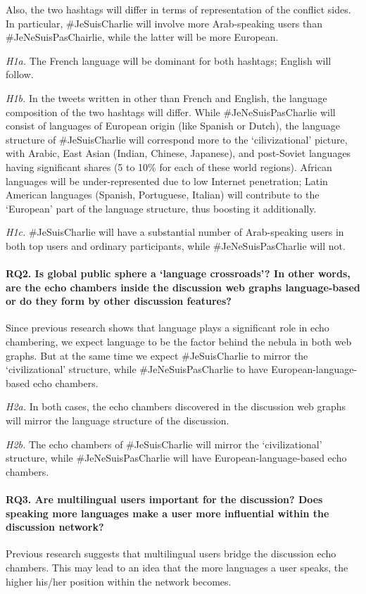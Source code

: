 Also, the two hashtags will differ in terms of representation of the conflict sides. In particular, \#JeSuisCharlie will involve more Arab-speaking users than \#JeNeSuisPasChairlie, while the latter will be more European.

\textit{H1a.} The French language will be dominant for both hashtags; English will follow.

\textit{H1b.} In the tweets written in other than French and English, the language composition of the two hashtags will differ. While \#JeNeSuisPasCharlie will consist of languages of European origin (like Spanish or Dutch), the language structure of \#JeSuisCharlie will correspond more to the ‘cilivizational’ picture, with Arabic, East Asian (Indian, Chinese, Japanese), and post-Soviet languages having significant shares (5 to 10\% for each of these world regions). African languages will be under-represented due to low Internet penetration; Latin American languages (Spanish, Portuguese, Italian) will contribute to the ‘European’ part of the language structure, thus boosting it additionally.

\textit{H1c.} \#JeSuisCharlie will have a substantial number of Arab-speaking users in both top users and ordinary participants, while \#JeNeSuisPasCharlie will not.

\paragraph{RQ2. Is global public sphere a ‘language crossroads’? In other words, are the echo chambers inside the discussion web graphs language-based or do they form by other discussion features?}
Since previous research shows that language plays a significant role in echo chambering, we expect language to be the factor behind the nebula in both web graphs. But at the same time we expect \#JeSuisCharlie to mirror the ‘civilizational’ structure, while \#JeNeSuisPasCharlie to have European-language-based echo chambers.

\textit{H2a.} In both cases, the echo chambers discovered in the discussion web graphs will mirror the language structure of the discussion.

\textit{H2b.} The echo chambers of \#JeSuisCharlie will mirror the ‘civilizational’ structure, while \#JeNeSuisPasCharlie will have European-language-based echo chambers.

\paragraph{RQ3. Are multilingual users important for the discussion? Does speaking more languages make a user more influential within the discussion network?}
Previous research suggests that multilingual users bridge the discussion echo chambers. This may lead to an idea that the more languages a user speaks, the higher his/her position within the network becomes.

